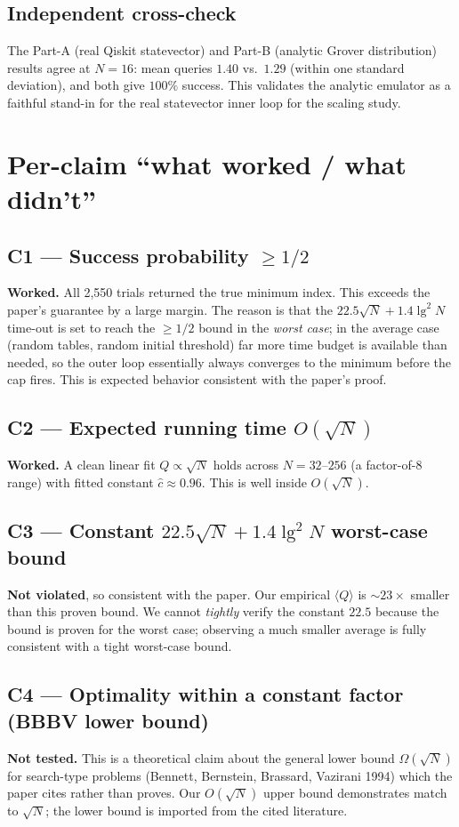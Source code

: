 \documentclass[11pt]{article}
\begin{document}
\subsection*{Independent cross-check}
The Part-A (real Qiskit statevector) and Part-B (analytic Grover
distribution) results agree at $N=16$: mean queries $1.40$ vs.\ $1.29$
(within one standard deviation), and both give $100\%$ success. This
validates the analytic emulator as a faithful stand-in for the real
statevector inner loop for the scaling study.

\section{Per-claim ``what worked / what didn't''}

\subsection*{C1 --- Success probability $\ge 1/2$}
\textbf{Worked.} All 2{,}550 trials returned the true minimum index.
This exceeds the paper's guarantee by a large margin. The reason is that
the $22.5\sqrt{N}+1.4\lg^2 N$ time-out is set to reach the $\ge 1/2$ bound
in the \emph{worst case}; in the average case (random tables, random
initial threshold) far more time budget is available than needed, so the
outer loop essentially always converges to the minimum before the cap
fires. This is expected behavior consistent with the paper's proof.

\subsection*{C2 --- Expected running time $O(\sqrt{N})$}
\textbf{Worked.} A clean linear fit $Q\propto\sqrt{N}$ holds across
$N=32\text{--}256$ (a factor-of-8 range) with fitted constant
$\hat c\approx 0.96$. This is well inside $O(\sqrt{N})$.

\subsection*{C3 --- Constant $22.5\sqrt{N}+1.4\lg^2 N$ worst-case bound}
\textbf{Not violated}, so consistent with the paper. Our empirical
$\langle Q\rangle$ is $\sim 23\times$ smaller than this proven bound. We
cannot \emph{tightly} verify the constant $22.5$ because the bound is
proven for the worst case; observing a much smaller average is fully
consistent with a tight worst-case bound.

\subsection*{C4 --- Optimality within a constant factor (BBBV lower bound)}
\textbf{Not tested.} This is a theoretical claim about the general lower
bound $\Omega(\sqrt{N})$ for search-type problems (Bennett, Bernstein,
Brassard, Vazirani 1994) which the paper cites rather than proves. Our
$O(\sqrt{N})$ upper bound demonstrates match to $\sqrt{N}$; the lower
bound is imported from the cited literature.
\end{document}
